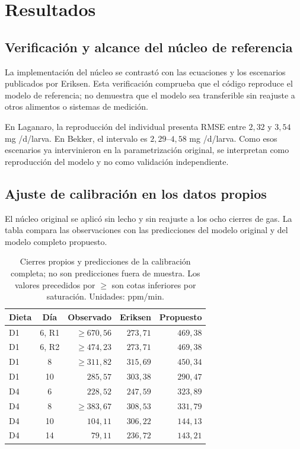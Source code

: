 \section{Resultados}

\subsection{Verificación y alcance del núcleo de referencia}

La implementación del núcleo se contrastó con las ecuaciones y los
escenarios publicados por Eriksen. Esta verificación comprueba que el
código reproduce el modelo de referencia; no demuestra que el modelo
sea transferible sin reajuste a otros alimentos o sistemas de medición.

En Laganaro, la reproducción del \co{} individual presenta RMSE entre
$2{,}32$ y $3{,}54$ mg \co{}/d/larva. En Bekker, el intervalo es
$2{,}29$--$4{,}58$ mg \co{}/d/larva. Como esos escenarios ya
intervinieron en la parametrización original, se interpretan como
reproducción del modelo y no como validación independiente.

\subsection{Ajuste de calibración en los datos propios}

El núcleo original se aplicó sin lecho y sin reajuste a los ocho cierres
de gas. La tabla compara las observaciones con las predicciones del
modelo original y del modelo completo propuesto.

\begin{table}[H]
\centering
\small
\caption{Cierres propios y predicciones de la calibración completa;
no son predicciones fuera de muestra. Los valores precedidos por $\geq$
son cotas inferiores por saturación. Unidades: ppm/min.}
\begin{tabular}{l c r r r}
\toprule
Dieta & Día & Observado & Eriksen & Propuesto \\
\midrule
D1 & 6, R1 & $\geq670{,}56$ & $273{,}71$ & $469{,}38$ \\
D1 & 6, R2 & $\geq474{,}23$ & $273{,}71$ & $469{,}38$ \\
D1 & 8     & $\geq311{,}82$ & $315{,}69$ & $450{,}34$ \\
D1 & 10    & $285{,}57$     & $303{,}38$ & $290{,}47$ \\
D4 & 6     & $228{,}52$     & $247{,}59$ & $323{,}89$ \\
D4 & 8     & $\geq383{,}67$ & $308{,}53$ & $331{,}79$ \\
D4 & 10    & $104{,}11$     & $306{,}22$ & $144{,}13$ \\
D4 & 14    & $79{,}11$      & $236{,}72$ & $143{,}21$ \\
\bottomrule
\end{tabular}
\end{table}

